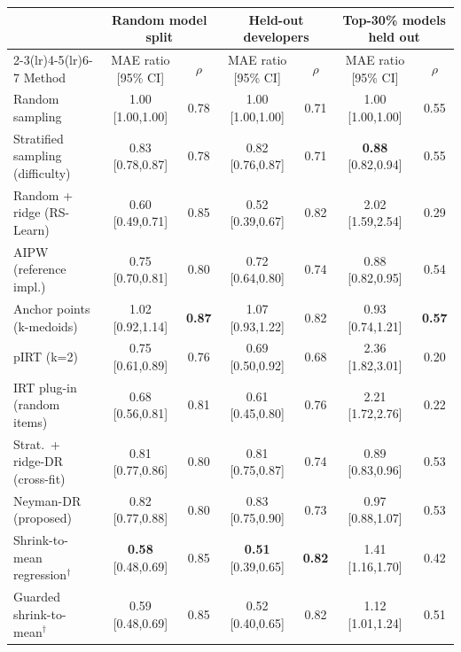 \begin{tabular}{l cc cc cc}
\toprule
 & \multicolumn{2}{c}{Random model split} & \multicolumn{2}{c}{Held-out developers} & \multicolumn{2}{c}{Top-30\% models held out}\\
\cmidrule(lr){2-3}\cmidrule(lr){4-5}\cmidrule(lr){6-7}
Method & MAE ratio [95\% CI] & $\rho$ & MAE ratio [95\% CI] & $\rho$ & MAE ratio [95\% CI] & $\rho$ \\
\midrule
Random sampling & 1.00 {\scriptsize[1.00,1.00]} & 0.78 & 1.00 {\scriptsize[1.00,1.00]} & 0.71 & 1.00 {\scriptsize[1.00,1.00]} & 0.55 \\
Stratified sampling (difficulty) & 0.83 {\scriptsize[0.78,0.87]} & 0.78 & 0.82 {\scriptsize[0.76,0.87]} & 0.71 & \textbf{0.88} {\scriptsize[0.82,0.94]} & 0.55 \\
Random + ridge (RS-Learn) & 0.60 {\scriptsize[0.49,0.71]} & 0.85 & 0.52 {\scriptsize[0.39,0.67]} & 0.82 & 2.02 {\scriptsize[1.59,2.54]} & 0.29 \\
AIPW (reference impl.) & 0.75 {\scriptsize[0.70,0.81]} & 0.80 & 0.72 {\scriptsize[0.64,0.80]} & 0.74 & 0.88 {\scriptsize[0.82,0.95]} & 0.54 \\
Anchor points (k-medoids) & 1.02 {\scriptsize[0.92,1.14]} & \textbf{0.87} & 1.07 {\scriptsize[0.93,1.22]} & 0.82 & 0.93 {\scriptsize[0.74,1.21]} & \textbf{0.57} \\
pIRT (k=2) & 0.75 {\scriptsize[0.61,0.89]} & 0.76 & 0.69 {\scriptsize[0.50,0.92]} & 0.68 & 2.36 {\scriptsize[1.82,3.01]} & 0.20 \\
IRT plug-in (random items) & 0.68 {\scriptsize[0.56,0.81]} & 0.81 & 0.61 {\scriptsize[0.45,0.80]} & 0.76 & 2.21 {\scriptsize[1.72,2.76]} & 0.22 \\
Strat.\ + ridge-DR (cross-fit) & 0.81 {\scriptsize[0.77,0.86]} & 0.80 & 0.81 {\scriptsize[0.75,0.87]} & 0.74 & 0.89 {\scriptsize[0.83,0.96]} & 0.53 \\
Neyman-DR (proposed) & 0.82 {\scriptsize[0.77,0.88]} & 0.80 & 0.83 {\scriptsize[0.75,0.90]} & 0.73 & 0.97 {\scriptsize[0.88,1.07]} & 0.53 \\
Shrink-to-mean regression$^\dagger$ & \textbf{0.58} {\scriptsize[0.48,0.69]} & 0.85 & \textbf{0.51} {\scriptsize[0.39,0.65]} & \textbf{0.82} & 1.41 {\scriptsize[1.16,1.70]} & 0.42 \\
Guarded shrink-to-mean$^\dagger$ & 0.59 {\scriptsize[0.48,0.69]} & 0.85 & 0.52 {\scriptsize[0.40,0.65]} & 0.82 & 1.12 {\scriptsize[1.01,1.24]} & 0.51 \\
\bottomrule
\end{tabular}

